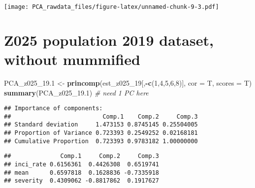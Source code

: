 \documentclass[]{article}
\newenvironment{Shaded}{\begin{snugshade}}{\end{snugshade}}
\newcommand{\CommentTok}[1]{\textcolor[rgb]{0.56,0.35,0.01}{\textit{#1}}}
\newcommand{\DataTypeTok}[1]{\textcolor[rgb]{0.13,0.29,0.53}{#1}}
\newcommand{\DecValTok}[1]{\textcolor[rgb]{0.00,0.00,0.81}{#1}}
\newcommand{\FloatTok}[1]{\textcolor[rgb]{0.00,0.00,0.81}{#1}}
\newcommand{\KeywordTok}[1]{\textcolor[rgb]{0.13,0.29,0.53}{\textbf{#1}}}
\newcommand{\NormalTok}[1]{#1}
\newcommand{\OperatorTok}[1]{\textcolor[rgb]{0.81,0.36,0.00}{\textbf{#1}}}
\newcommand{\StringTok}[1]{\textcolor[rgb]{0.31,0.60,0.02}{#1}}
\begin{document}
\texttt{[image: PCA\_rawdata\_files/figure-latex/unnamed-chunk-9-3.pdf]}

\hypertarget{z025-population-2019-dataset-without-mummified}{%
\section{Z025 population 2019 dataset, without
mummified}\label{z025-population-2019-dataset-without-mummified}}

\begin{Shaded}
\begin{Highlighting}[]
\NormalTok{PCA_z025_}\FloatTok{19.1}\NormalTok{ <-}\StringTok{ }\KeywordTok{princomp}\NormalTok{(est_z025_}\DecValTok{19}\NormalTok{[,}\OperatorTok{-}\KeywordTok{c}\NormalTok{(}\DecValTok{1}\NormalTok{,}\DecValTok{4}\NormalTok{,}\DecValTok{5}\NormalTok{,}\DecValTok{6}\NormalTok{,}\DecValTok{8}\NormalTok{)], }\DataTypeTok{cor =}\NormalTok{ T, }\DataTypeTok{scores =}\NormalTok{ T)}
\KeywordTok{summary}\NormalTok{(PCA_z025_}\FloatTok{19.1}\NormalTok{) }\CommentTok{# need 1 PC here}
\end{Highlighting}
\end{Shaded}

\begin{verbatim}
## Importance of components:
##                          Comp.1    Comp.2     Comp.3
## Standard deviation     1.473153 0.8745145 0.25504005
## Proportion of Variance 0.723393 0.2549252 0.02168181
## Cumulative Proportion  0.723393 0.9783182 1.00000000
\end{verbatim}

\begin{Shaded}
\end{Shaded}

\begin{verbatim}
##              Comp.1     Comp.2     Comp.3
## inci_rate 0.6156361  0.4426308  0.6519741
## mean      0.6597818  0.1628836 -0.7335918
## severity  0.4309062 -0.8817862  0.1917627
\end{verbatim}

\begin{Shaded}
\end{Shaded}
\end{document}
